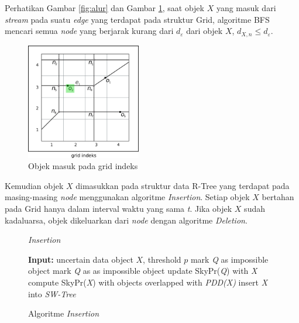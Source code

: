 \documentclass[conference]{IEEEtran}
\begin{document}
Perhatikan Gambar \ref{fig:alur} dan Gambar \ref{fig:alur1-2}, saat objek $ X $ yang masuk dari \textit{stream} pada suatu \textit{edge} yang terdapat pada struktur Grid, algoritme BFS mencari semua \textit{node} yang berjarak kurang dari $ d_\varepsilon $ dari objek $ X $, $ d_{X, n} \le d_\varepsilon $.

\begin{figure}[H]
	\centering
	\includegraphics[width=5cm]{img/alur/alur1.png}
	\caption{Objek masuk pada grid indeks}
	\label{fig:alur1-2}
\end{figure}

Kemudian objek $ X $ dimasukkan pada struktur data R-Tree yang terdapat pada masing-masing \textit{node} menggunakan algoritme \textit{Insertion}. Setiap objek $ X $ bertahan pada Grid hanya dalam interval waktu yang sama \textit{t}. Jika objek $ X $ sudah kadaluarsa, objek dikeluarkan dari \textit{node} dengan algoritme \textit{Deletion}.

	
	\begin{figure}[H]
		\begin{algorithm}[H]
			\label{algo:insertion}
			\caption{\textit{Insertion}}
			\begin{algorithmic}[1]
				\State \textbf{Input: } uncertain data object $ X $, threshold $ p $
				\State mark \textit{Q} as impossible object
				\Else
				\State mark \textit{Q} as as impossible object
				\Else 
				\State update SkyPr(\textit{Q}) with \textit{X}
				\EndIf
				\EndIf
				\EndFor
				\State compute SkyPr(\textit{X}) with objects overlapped with \textit{PDD(X)}
				\State insert \textit{X} into \textit{SW-Tree}
			\end{algorithmic}
		\end{algorithm}
		\caption{Algoritme \textit{Insertion}}
	\end{figure}
\end{document}
